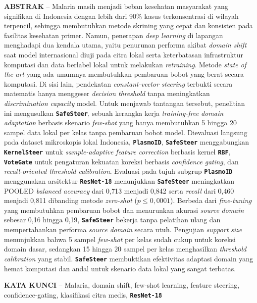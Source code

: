 \documentclass[conference]{IEEEtran}
\newcommand{\nama}[1]{\textbf{\texttt{#1}}}
\begin{document}
{
\noindent \textbf{ABSTRAK} -- Malaria masih menjadi beban kesehatan masyarakat yang signifikan di Indonesia dengan lebih dari 90\% kasus terkonsentrasi di wilayah terpencil, sehingga membutuhkan metode skrining yang cepat dan konsisten pada fasilitas kesehatan primer. Namun, penerapan \textit{deep learning} di lapangan menghadapi dua kendala utama, yaitu penurunan performa akibat \textit{domain shift} saat model internasional diuji pada citra lokal serta keterbatasan infrastruktur komputasi dan data berlabel lokal untuk melakukan \textit{retraining}. Metode \textit{state of the art} yang ada umumnya membutuhkan pembaruan bobot yang berat secara komputasi. Di sisi lain, pendekatan \textit{constant-vector steering} terbukti secara matematis hanya menggeser \textit{decision threshold} tanpa meningkatkan \textit{discrimination capacity} model. Untuk menjawab tantangan tersebut, penelitian ini mengusulkan \nama{SafeSteer}, sebuah kerangka kerja \textit{training-free domain adaptation} berbasis skenario \textit{few-shot} yang hanya membutuhkan 5 hingga 20 sampel data lokal per kelas tanpa pembaruan bobot model. Dievaluasi langsung pada dataset mikroskopis lokal Indonesia, \nama{PlasmoID}, \nama{SafeSteer} menggabungkan \nama{KernelSteer} untuk \textit{sample-adaptive feature correction} berbasis kernel \nama{RBF}, \nama{VoteGate} untuk pengaturan kekuatan koreksi berbasis \textit{confidence gating}, dan \textit{recall-oriented threshold calibration}. Evaluasi pada tujuh subgrup \nama{PlasmoID} menggunakan arsitektur \nama{ResNet-18} menunjukkan \nama{SafeSteer} meningkatkan POOLED \textit{balanced accuracy} dari 0,713 menjadi 0,842 serta \textit{recall} dari 0,460 menjadi 0,811 dibanding metode \textit{zero-shot} ($p \leq 0{,}0001$). Berbeda dari \textit{fine-tuning} yang membutuhkan pembaruan bobot dan menurunkan akurasi \textit{source domain} sebesar 0,16 hingga 0,19, \nama{SafeSteer} bekerja tanpa pelatihan ulang dan mempertahankan performa \textit{source domain} secara utuh. Pengujian \textit{support size} menunjukkan bahwa 5 sampel \textit{few-shot} per kelas sudah cukup untuk koreksi domain dasar, sedangkan 15 hingga 20 sampel per kelas menghasilkan \textit{threshold calibration} yang stabil. \nama{SafeSteer} membuktikan efektivitas adaptasi domain yang hemat komputasi dan andal untuk skenario data lokal yang sangat terbatas.
\vspace{0.8em}

\noindent \textbf{KATA KUNCI} -- Malaria, domain shift, few-shot learning, feature steering, confidence-gating, klasifikasi citra medis, \nama{ResNet-18}

}
\end{document}
